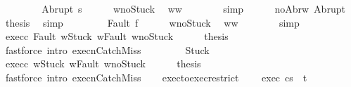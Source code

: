 \begin{isabellebody}
\ \ \isamarkupfalse%
\isanewline
\ \ \ \ \isamarkupfalse%
\ {\isacharparenleft}Abrupt\ s{\isacharprime}{\isacharparenright}\isanewline
\ \ \ \ \isamarkupfalse%
\ w{\isacharprime}{\isacharunderscore}noStuck\ \isamarkupfalse%
\ {\isachardoublequoteopen}w{\isacharprime}{\isacharequal}w{\isachardoublequoteclose}\isanewline
\ \ \ \ \ \ \isamarkupfalse%
\ simp\isanewline
\ \ \ \ \isamarkupfalse%
\ noAbr{\isacharunderscore}w\ Abrupt\ \isamarkupfalse%
\ {\isacharquery}thesis\ \isamarkupfalse%
\ simp\isanewline
\ \ \isamarkupfalse%
\isanewline
\ \ \ \ \isamarkupfalse%
\ {\isacharparenleft}Fault\ f{\isacharparenright}\isanewline
\ \ \ \ \isamarkupfalse%
\ w{\isacharprime}{\isacharunderscore}noStuck\ \isamarkupfalse%
\ {\isachardoublequoteopen}w{\isacharprime}{\isacharequal}w{\isachardoublequoteclose}\isanewline
\ \ \ \ \ \ \isamarkupfalse%
\ simp\isanewline
\ \ \ \ \isamarkupfalse%
\ exec{\isacharunderscore}c{}{\isacharprime}\ Fault\ w{\isacharunderscore}Stuck\ w{\isacharunderscore}Fault\ w{\isacharprime}{\isacharunderscore}noStuck\isanewline
\ \ \ \ \isamarkupfalse%
\ {\isacharquery}thesis\isanewline
\ \ \ \ \ \ \isamarkupfalse%
\ {\isacharparenleft}fastforce\ intro{\isacharcolon}\ execn{\isachardot}CatchMiss{\isacharparenright}\isanewline
\ \ \isamarkupfalse%
\isanewline
\ \ \ \ \isamarkupfalse%
\ Stuck\isanewline
\ \ \ \ \isamarkupfalse%
\ exec{\isacharunderscore}c{}{\isacharprime}\ w{\isacharunderscore}Stuck\ w{\isacharunderscore}Fault\ w{\isacharprime}{\isacharunderscore}noStuck\isanewline
\ \ \ \ \isamarkupfalse%
\ {\isacharquery}thesis\isanewline
\ \ \ \ \ \ \isamarkupfalse%
\ {\isacharparenleft}fastforce\ intro{\isacharcolon}\ execn{\isachardot}CatchMiss{\isacharparenright}\isanewline
\ \ \isamarkupfalse%
\isanewline
{}\isamarkupfalse%
%
\endisatagproof
{\isafoldproof}%
%
\isadelimproof
\isanewline
%
\endisadelimproof
\isanewline
\isanewline
{}\isamarkupfalse%
\ exec{\isacharunderscore}to{\isacharunderscore}exec{\isacharunderscore}restrict{\isacharcolon}\ \isanewline
\ \ \ exec{\isacharcolon}\ {\isachardoublequoteopen}{\isasymGamma}{\isasymturnstile}{\isasymlangle}c{\isacharcomma}s{\isasymrangle}\ {\isasymRightarrow}\ t{\isachardoublequoteclose}\ \isanewline

\end{isabellebody}
